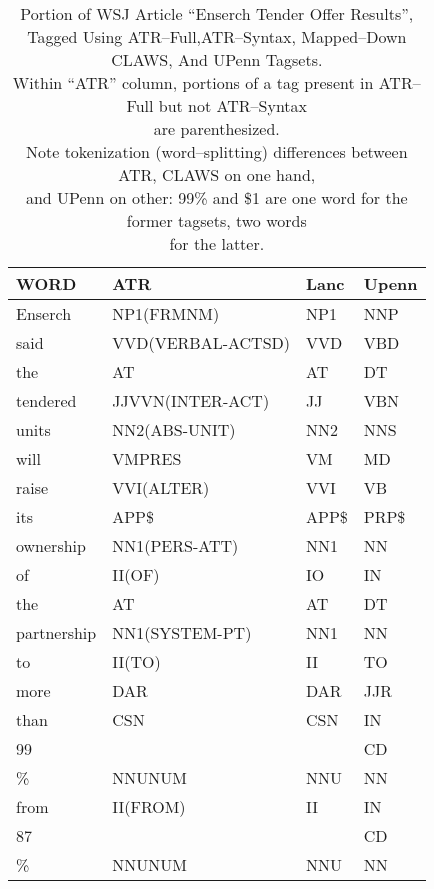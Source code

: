\begin{table}
 \caption{Portion of WSJ Article ``Enserch Tender Offer Results'',\\
 Tagged Using ATR--Full,ATR--Syntax, Mapped--Down CLAWS, And UPenn Tagsets.\\
 Within ``ATR'' column, portions of a tag present in ATR--Full but not ATR--Syntax\\
 are parenthesized. \\
 Note tokenization (word--splitting) differences between ATR, CLAWS on one hand,\\
 and UPenn on other: 99\% and \$1 are one word for
 the former tagsets, two words\\
 for the latter.}

 \begin{center}
 \begin{minipage}{0.53\textwidth}
  \small
  \setlength{\tabcolsep}{0.5mm}
  \renewcommand{\arraystretch}{}
  \begin{tabular}{|l||l|l|l|} \hline
   WORD	& ATR			& Lanc 	& Upenn \\ \hline
   Enserch	& NP1(FRMNM)		& NP1 &  NNP \\
   said	& VVD(VERBAL-ACTSD)	& VVD &  VBD \\
   the	& AT			& AT  &  DT  \\
   tendered & JJVVN(INTER-ACT)	& JJ  &  VBN \\
   units	& NN2(ABS-UNIT)		& NN2 &  NNS \\
   will	& VMPRES		& VM  &  MD  \\
   raise	& VVI(ALTER)		& VVI &  VB  \\
   its	& APP\$			& APP\$ &  PRP\$\\
   ownership & NN1(PERS-ATT)	& NN1 &  NN  \\
   of	& II(OF)		& IO  &  IN  \\
   the	& AT			& AT  &  DT  \\
   partnership& NN1(SYSTEM-PT)	& NN1 &  NN  \\
   to	& II(TO)		& II  &  TO  \\
   more	& DAR			& DAR &  JJR \\
   than	& CSN			& CSN &  IN  \\
   99	&			&     &  CD  \\	
   \%	& NNUNUM		& NNU &  NN  \\
   from	& II(FROM)		& II  &  IN  \\
   87	&			&     &  CD  \\
   \%	& NNUNUM		& NNU &  NN  \\

\end{tabular}
\end{minipage}
\end{center}
\end{table}

